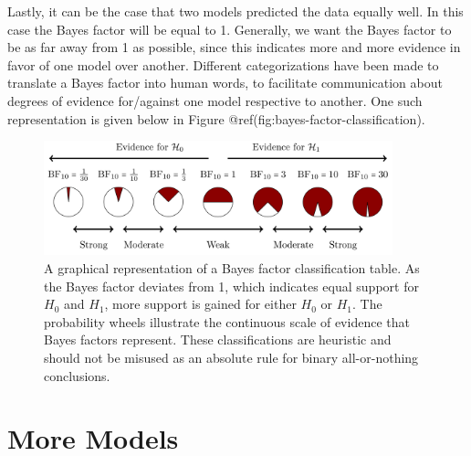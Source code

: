 \documentclass[
  letterpaper,
  DIV=11,
  numbers=noendperiod]{scrreprt}
\begin{document}
Lastly, it can be the case that two models predicted the data equally
well. In this case the Bayes factor will be equal to 1. Generally, we
want the Bayes factor to be as far away from 1 as possible, since this
indicates more and more evidence in favor of one model over another.
Different categorizations have been made to translate a Bayes factor
into human words, to facilitate communication about degrees of evidence
for/against one model respective to another. One such representation is
given below in Figure @ref(fig:bayes-factor-classification).

\begin{figure}

{\centering \includegraphics[width=0.9\textwidth,height=\textheight]{Figures/BF_TableInterpretation.png}

}

\caption{A graphical representation of a Bayes factor classification
table. As the Bayes factor deviates from 1, which indicates equal
support for \(H_0\) and \(H_1\), more support is gained for either
\(H_0\) or \(H_1\). The probability wheels illustrate the continuous
scale of evidence that Bayes factors represent. These classifications
are heuristic and should not be misused as an absolute rule for binary
all-or-nothing conclusions.}

\end{figure}

\hypertarget{more-models-section}{%
\section{More Models}\label{more-models-section}}
\end{document}
